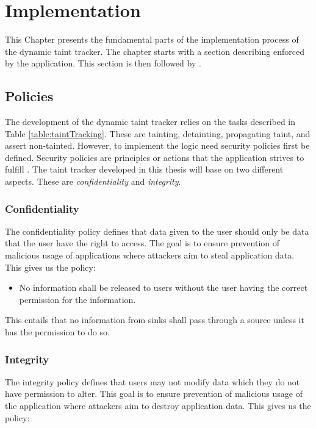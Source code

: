 \chapter{Implementation}

This Chapter presents the fundamental parts of the implementation process of the dynamic taint tracker. The chapter starts with a section describing \textit{} enforced by the application. This section is then followed by \textit{}.



\section{Policies}
\label{Policies}
The development of the dynamic taint tracker relies on the tasks described in Table \ref{table:taintTracking}. These are tainting, detainting, propagating taint, and assert non-tainted. However, to implement the logic need security policies first be defined. Security policies are principles or actions that the application strives to fulfill \parencite{BayukJenniferL2012Cspg}. The taint tracker developed in this thesis will base on two different aspects. These are \textit{confidentiality} and \textit{integrity}.



\subsection{Confidentiality}
The confidentiality policy defines that data given to the user should only be data that the user have the right to access. The goal is to ensure prevention of malicious usage of applications where attackers aim to steal application data. This gives us the policy:

\hfill
\begin{itemize}
    \item No information shall be released to users without the user having the correct permission for the information.
\end{itemize}
\hfill

This entails that no information from sinks shall pass through a source unless it has the permission to do so.



\subsection{Integrity}
The integrity policy defines that users may not modify data which they do not have permission to alter. This goal is to ensure prevention of malicious usage of the application where attackers aim to destroy application data. This gives us the policy:

